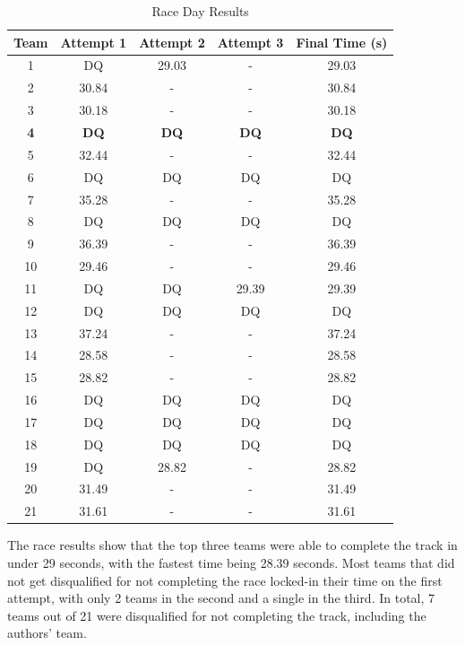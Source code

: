 \documentclass[conference]{IEEEtran}
\begin{document}
\begin{table}[htbp]
	\caption{Race Day Results}
	\begin{center}
	\begin{tabular}{|c|c|c|c|c|}
		\hline
		\textbf{Team} & \textbf{Attempt 1} & \textbf{Attempt 2} & \textbf{Attempt 3} & \textbf{Final Time (s)} \\
		\hline
		1 & DQ & 29.03 & - & 29.03 \\
		2 & 30.84 & - & - & 30.84 \\
		3 & 30.18 & - & - & 30.18 \\
		\textbf{4} & \textbf{DQ} & \textbf{DQ} & \textbf{DQ} & \textbf{DQ} \\
		5 & 32.44 & - & - & 32.44 \\
		6 & DQ & DQ & DQ & DQ \\
		7 & 35.28 & - & - & 35.28 \\
		8 & DQ & DQ & DQ & DQ \\
		9 & 36.39 & - & - & 36.39 \\
		10 & 29.46 & - & - & 29.46 \\
		11 & DQ & DQ & 29.39 & 29.39 \\
		12 & DQ & DQ & DQ & DQ \\
		13 & 37.24 & - & - & 37.24 \\
		14 & 28.58 & - & - & 28.58 \\
		15 & 28.82 & - & - & 28.82 \\
		16 & DQ & DQ & DQ & DQ \\
		17 & DQ & DQ & DQ & DQ \\
		18 & DQ & DQ & DQ & DQ \\
		19 & DQ & 28.82 & - & 28.82 \\
		20 & 31.49 & - & - & 31.49 \\
		21 & 31.61 & - & - & 31.61 \\

		\hline
	\end{tabular}
	\label{tab:raceResults}
	\end{center}
\end{table}

The race results show that the top three teams were able to complete the track in under 29 seconds, with the fastest time being 28.39 seconds. Most teams that did not get disqualified for not completing the race locked-in their time on the first attempt, with only 2 teams in the second and a single in the third. In total, 7 teams out of 21 were disqualified for not completing the track, including the authors' team.
\end{document}
